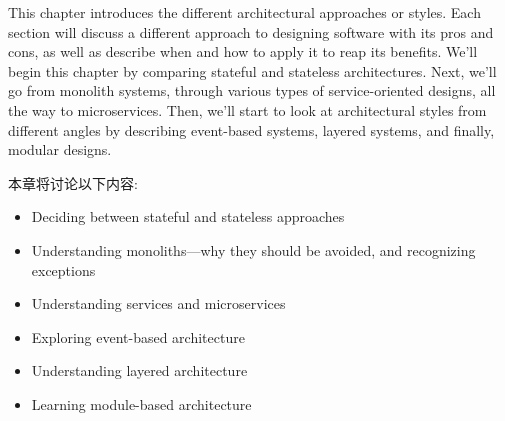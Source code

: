 This chapter introduces the different architectural approaches or styles. Each section will discuss a different approach to designing software with its pros and cons, as well as describe when and how to apply it to reap its benefits. We'll begin this chapter by comparing stateful and stateless architectures. Next, we'll go from monolith systems, through various types of service-oriented designs, all the way to microservices. Then, we'll start to look at architectural styles from different angles by describing event-based systems, layered systems, and finally, modular designs.


本章将讨论以下内容:

\begin{itemize}
\item Deciding between stateful and stateless approaches
\item Understanding monoliths—why they should be avoided, and recognizing exceptions
\item Understanding services and microservices
\item Exploring event-based architecture 
\item Understanding layered architecture
\item Learning module-based architecture

\end{itemize}